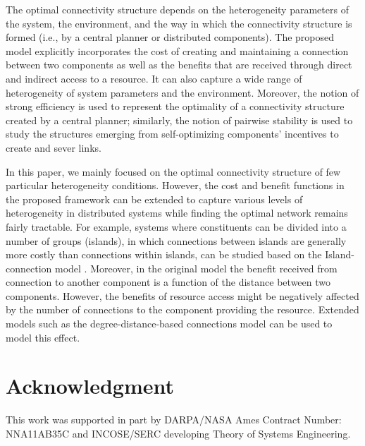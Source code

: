 \documentclass[journal,onecolumn]{IEEEtran}
\theoremstyle{plain}
\begin{document}
The optimal connectivity structure depends on the heterogeneity parameters of the system, the environment, and the way in which the connectivity structure is formed (i.e., by a central planner or distributed components). The proposed model explicitly incorporates the cost of creating and maintaining a connection between two components as well as the benefits that are received through direct and indirect access to a resource. It can also capture a wide range of heterogeneity of system parameters and the environment. Moreover, the notion of strong efficiency is used to represent the optimality of a connectivity structure created by a central planner; similarly, the notion of pairwise stability is used to study the structures emerging from self-optimizing components' incentives to create and sever links. 





In this paper, we mainly focused on the optimal connectivity structure of few particular heterogeneity conditions. However, the cost and benefit functions in the proposed framework can be extended to capture various levels of heterogeneity in distributed systems while finding the optimal network remains fairly tractable. For example, systems where constituents can be divided into a number of groups (islands), in which connections between islands are generally more costly than connections within islands, can be studied based on the Island-connection model \citep{jackson2005economics}. Moreover, in the original model the benefit received from connection to another component is a function of the distance between two components. However, the benefits of resource access might be negatively affected by the number of connections to the component providing the resource. Extended models such as the degree-distance-based connections model \citep{mohlmeier2013degree} can be used to model this effect.

\section*{Acknowledgment}
This work was supported in part by DARPA/NASA Ames Contract Number: NNA11AB35C and INCOSE/SERC developing Theory of Systems Engineering. 










































\ifCLASSOPTIONcaptionsoff
  \newpage
\fi









\end{document}
